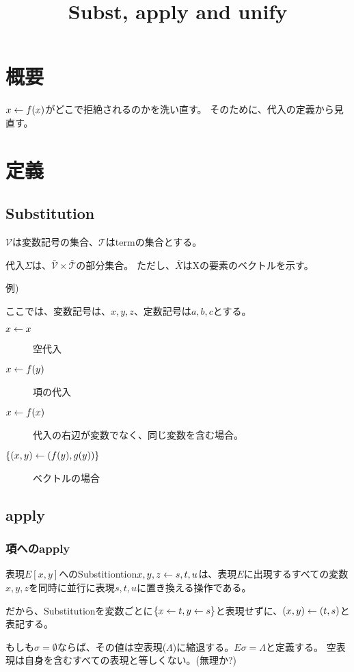 \documentclass[10pt, oneside]{jarticle}   	%
\title{Subst, apply and unify}
\author{\myname}
\begin{document}
\maketitle

%


\section{概要}
$x \leftarrow f(x)$がどこで拒絶されるのかを洗い直す。
そのために、代入の定義から見直す。

\section{定義}
\subsection{Substitution}
$\mathcal{V}$は変数記号の集合、$\mathcal{T}$はtermの集合とする。

代入$\mathcal{Σ}$は、$\mathcal{\bar{V}}\times\mathcal{\bar{T}}$の部分集合。
ただし、$\bar{X}$はXの要素のベクトルを示す。

例)

ここでは、変数記号は、$x,y,z$、定数記号は$a,b,c$とする。

\begin{description}
\item[$x \leftarrow x $]  空代入
\item[$x \leftarrow f(y)$] 項の代入
\item[$x \leftarrow f(x)$] 代入の右辺が変数でなく、同じ変数を含む場合。
\item[$\{(x,y) \leftarrow (f(y),g(y))\}$] ベクトルの場合
\end{description}

\subsection{apply}
\subsubsection{項へのapply}
表現$E[x,y]$へのSubstitiontion$x,y,z \leftarrow s,t,u$は、表現$E$に出現するすべての変数$x,y,z$を同時に並行に表現$s,t,u$に置き換える操作である。

だから、Substitutionを変数ごとに$\{{x \leftarrow t,y \leftarrow s}\}$と表現せずに、$(x,y) \leftarrow (t,s)$と表記する。

もしも$\sigma=\emptyset$ならば、その値は空表現($\varLambda$)に縮退する。$E\sigma = \varLambda$と定義する。
空表現は自身を含むすべての表現と等しくない。(無理か?)
\end{document}
